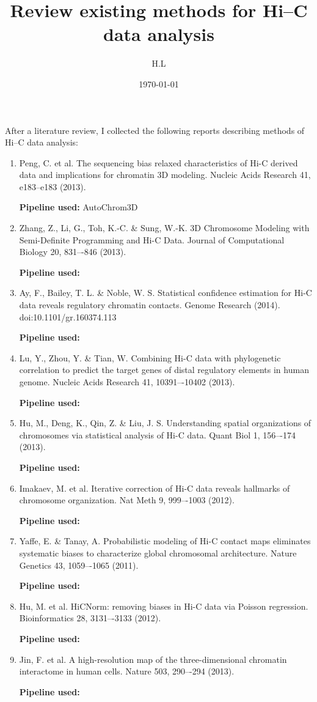 \documentclass[a4paper,12pt]{article}
\title{Review existing methods for Hi--C data analysis}
\author{H.L}
\date{\today}
\begin{document}
\maketitle

After a literature review, I collected the following reports 
describing methods of Hi--C data analysis:
	
\begin{enumerate}
	\item Peng, C. et al. The sequencing bias relaxed characteristics of Hi-C derived data and implications for chromatin 3D modeling. Nucleic Acids Research 41, e183–e183 (2013).

	\textbf{Pipeline used:} AutoChrom3D

	\item Zhang, Z., Li, G., Toh, K.-C. \& Sung, W.-K. 3D Chromosome Modeling with Semi-Definite Programming and Hi-C Data. Journal of Computational Biology 20, 831–-846 (2013).

	\textbf{Pipeline used:}

	\item Ay, F., Bailey, T. L. \& Noble, W. S. Statistical confidence estimation for Hi-C data reveals regulatory chromatin contacts. Genome Research (2014). doi:10.1101/gr.160374.113

	\textbf{Pipeline used:}

	\item Lu, Y., Zhou, Y. \& Tian, W. Combining Hi-C data with phylogenetic correlation to predict the target genes of distal regulatory elements in human genome. Nucleic Acids Research 41, 10391–-10402 (2013).

	\textbf{Pipeline used:}

	\item Hu, M., Deng, K., Qin, Z. \& Liu, J. S. Understanding spatial organizations of chromosomes via statistical analysis of Hi-C data. Quant Biol 1, 156–-174 (2013).

	\textbf{Pipeline used:}

	\item Imakaev, M. et al. Iterative correction of Hi-C data reveals hallmarks of chromosome organization. Nat Meth 9, 999–-1003 (2012).

	\textbf{Pipeline used:}

	\item Yaffe, E. \& Tanay, A. Probabilistic modeling of Hi-C contact maps eliminates systematic biases to characterize global chromosomal architecture. Nature Genetics 43, 1059–-1065 (2011).

	\textbf{Pipeline used:}

	\item Hu, M. et al. HiCNorm: removing biases in Hi-C data via Poisson regression. Bioinformatics 28, 3131–-3133 (2012).

	\textbf{Pipeline used:}

	\item Jin, F. et al. A high-resolution map of the three-dimensional chromatin interactome in human cells. Nature 503, 290–-294 (2013).

	\textbf{Pipeline used:}
\end{enumerate}
\end{document}
